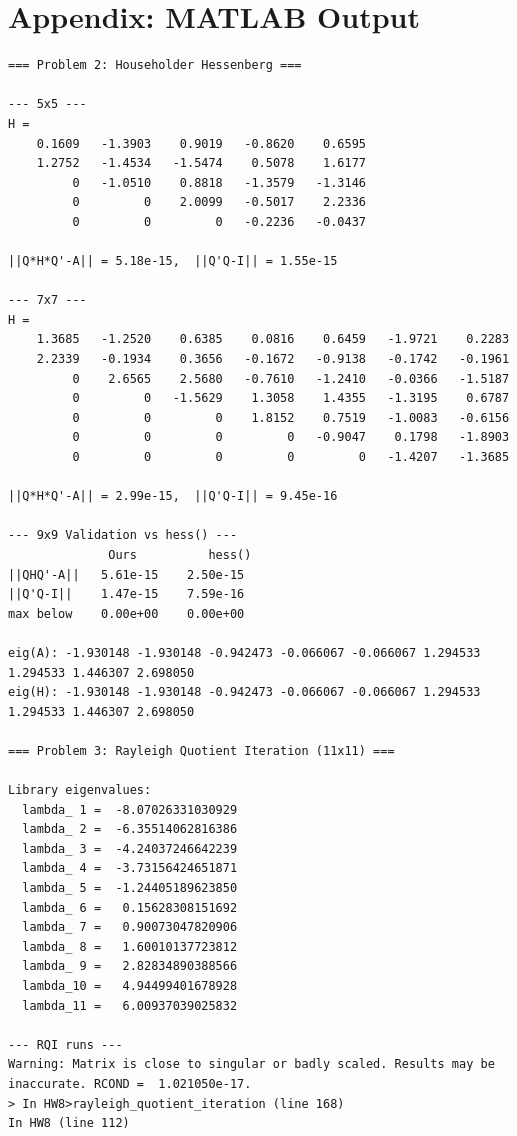 \documentclass[11pt]{article}
\begin{document}
\section*{Appendix: MATLAB Output}

\begin{verbatim}
=== Problem 2: Householder Hessenberg ===

--- 5x5 ---
H =
    0.1609   -1.3903    0.9019   -0.8620    0.6595
    1.2752   -1.4534   -1.5474    0.5078    1.6177
         0   -1.0510    0.8818   -1.3579   -1.3146
         0         0    2.0099   -0.5017    2.2336
         0         0         0   -0.2236   -0.0437

||Q*H*Q'-A|| = 5.18e-15,  ||Q'Q-I|| = 1.55e-15

--- 7x7 ---
H =
    1.3685   -1.2520    0.6385    0.0816    0.6459   -1.9721    0.2283
    2.2339   -0.1934    0.3656   -0.1672   -0.9138   -0.1742   -0.1961
         0    2.6565    2.5680   -0.7610   -1.2410   -0.0366   -1.5187
         0         0   -1.5629    1.3058    1.4355   -1.3195    0.6787
         0         0         0    1.8152    0.7519   -1.0083   -0.6156
         0         0         0         0   -0.9047    0.1798   -1.8903
         0         0         0         0         0   -1.4207   -1.3685

||Q*H*Q'-A|| = 2.99e-15,  ||Q'Q-I|| = 9.45e-16

--- 9x9 Validation vs hess() ---
              Ours          hess()
||QHQ'-A||   5.61e-15    2.50e-15
||Q'Q-I||    1.47e-15    7.59e-16
max below    0.00e+00    0.00e+00

eig(A): -1.930148 -1.930148 -0.942473 -0.066067 -0.066067 1.294533 1.294533 1.446307 2.698050 
eig(H): -1.930148 -1.930148 -0.942473 -0.066067 -0.066067 1.294533 1.294533 1.446307 2.698050 

=== Problem 3: Rayleigh Quotient Iteration (11x11) ===

Library eigenvalues:
  lambda_ 1 =  -8.07026331030929
  lambda_ 2 =  -6.35514062816386
  lambda_ 3 =  -4.24037246642239
  lambda_ 4 =  -3.73156424651871
  lambda_ 5 =  -1.24405189623850
  lambda_ 6 =   0.15628308151692
  lambda_ 7 =   0.90073047820906
  lambda_ 8 =   1.60010137723812
  lambda_ 9 =   2.82834890388566
  lambda_10 =   4.94499401678928
  lambda_11 =   6.00937039025832

--- RQI runs ---
Warning: Matrix is close to singular or badly scaled. Results may be inaccurate. RCOND =  1.021050e-17. 
> In HW8>rayleigh_quotient_iteration (line 168)
In HW8 (line 112)
 

\end{verbatim}
\end{document}
